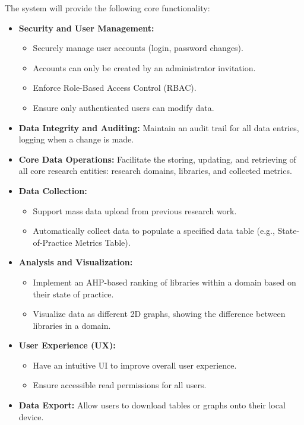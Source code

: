 \documentclass[12pt]{article}
\begin{document}
The system will provide the following core functionality:
\begin{itemize}
  \item \textbf{Security and User Management:}
  \begin{itemize}
    \item Securely manage user accounts (login, password changes).
    \item Accounts can only be created by an administrator invitation.
    \item Enforce Role-Based Access Control (RBAC).
    \item Ensure only authenticated users can modify data.
  \end{itemize}
  \item \textbf{Data Integrity and Auditing:} Maintain an audit trail for all data entries, logging when a change is made.
  \item \textbf{Core Data Operations:} Facilitate the storing, updating, and retrieving of all core research entities: research domains, libraries, and collected metrics.
  \item \textbf{Data Collection:}
  \begin{itemize}
    \item Support mass data upload from previous research work.
    \item Automatically collect data to populate a specified data table (e.g., State-of-Practice Metrics Table).
  \end{itemize}
  \item \textbf{Analysis and Visualization:}
  \begin{itemize}
    \item Implement an AHP-based ranking of libraries within a domain based on their state of practice.
    \item Visualize data as different 2D graphs, showing the difference between libraries in a domain.
  \end{itemize}
  \item \textbf{User Experience (UX):}
  \begin{itemize}
    \item Have an intuitive UI to improve overall user experience.
    \item Ensure accessible read permissions for all users.
  \end{itemize}
  \item \textbf{Data Export:} Allow users to download tables or graphs onto their local device.
\end{itemize}
\end{document}

